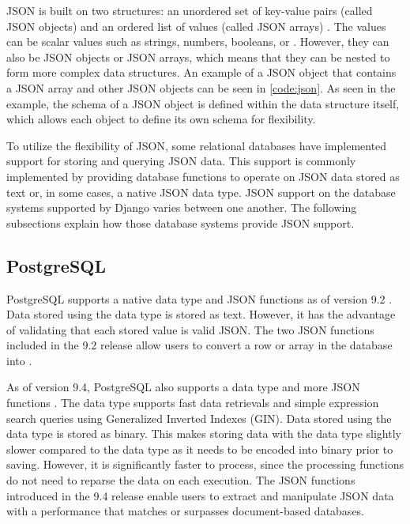 \noindent
\begin{minipage}{\linewidth}

\end{minipage}

JSON is built on two structures: an unordered set of key-value pairs (called
JSON objects) and an ordered list of values (called JSON arrays)
\cite{json:org}. The values can be scalar values such as strings, numbers,
booleans, or . However, they can also be JSON objects or JSON
arrays, which means that they can be nested to form more complex data
structures. An example of a JSON object that contains a JSON array and other
JSON objects can be seen in \autoref{code:json}. As seen in the example, the
schema of a JSON object is defined within the data structure itself, which
allows each object to define its own schema for flexibility.

To utilize the flexibility of JSON, some relational databases have implemented
support for storing and querying JSON data. This support is commonly
implemented by providing database functions to operate on JSON data stored as
text or, in some cases, a native JSON data type. JSON support on the database
systems supported by Django varies between one another. The following
subsections explain how those database systems provide JSON support.

\subsection{PostgreSQL}

PostgreSQL supports a native  data type and JSON functions as of
version 9.2 \cite{postgresql:9.2}. Data stored using the  data type
is stored as text. However, it has the advantage of validating that each stored
value is valid JSON. The two JSON functions included in the 9.2 release allow
users to convert a row or array in the database into .

As of version 9.4, PostgreSQL also supports a  data type and more
JSON functions \cite{postgresql:9.4}. The  data type supports fast
data retrievals and simple expression search queries using Generalized Inverted
Indexes (GIN). Data stored using the  data type is stored as
binary. This makes storing data with the  data type slightly slower
compared to the  data type as it needs to be encoded into binary
prior to saving. However, it is significantly faster to process, since the
processing functions do not need to reparse the data on each execution. The
JSON functions introduced in the 9.4 release enable users to extract and
manipulate JSON data with a performance that matches or surpasses
document-based databases.

